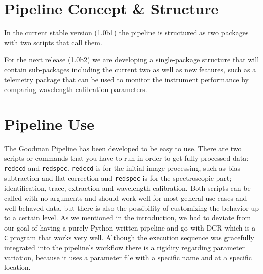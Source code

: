\documentclass[11pt,twoside]{article}
\begin{document}
\section{Pipeline Concept \& Structure}

In the current stable version (1.0b1) the pipeline is structured as two packages
with two scripts that call them.


% 
% 

For the next release (1.0b2) we are developing a single-package structure that will
contain sub-packages including the current two as well as new features, such as
a telemetry package that can be used to monitor the instrument performance by
comparing wavelength calibration parameters.

\section{Pipeline Use}
The Goodman Pipeline has been developed to be easy to use. There are two scripts
or commands that you have to run in order to get fully processed data:
\verb=redccd= and \verb=redspec=.
\verb=redccd= is for the initial image processing, such as bias
subtraction and flat correction and \verb=redspec= is for the spectroscopic
part; identification, trace, extraction and wavelength calibration.
Both scripts can be called with no arguments and should work well for most general use cases
and well behaved data, but there is also the possibility of customizing the behavior
up to a certain level. As we mentioned in the introduction, we had to deviate from
our goal of having a purely Python-written pipeline and go with DCR which is a 
\verb=C= program that works very well. Although the execution sequence was
gracefully integrated into the pipeline's workflow there is a rigidity regarding
parameter variation, because it uses a parameter file with a specific name and at
a specific location.
\end{document}
